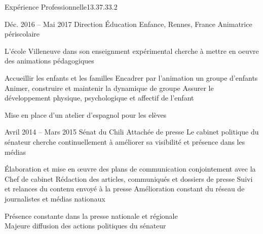 \documentclass[30pt, french]{tccv}
\begin{document}
\begin{upshape}
\begin{flat_frame}{Expérience Professionnelle}{13.3}{7.3}{3.2}{}
\begin{eventlist}
\setlength{\parskip}{0pt}
\item{Déc. 2016 -- Mai 2017 }     
  {Direction Éducation Enfance, Rennes, France}     
  {Animatrice périscolaire}
  \fontsize{9pt}{1em}\color{text}\bodyfontlight\upshape\selectfont

 L'école Villeneuve dans son enseignment expérimental cherche à mettre en oeuvre des animations pédagogiques   \\
  
\setlength{\parskip}{-10pt}
\begin{itemize}
      \setlength\itemsep{-3pt} 
      \cvitem[\checkmark] Accueillir les enfants et les familles
      \cvitem[\checkmark] Encadrer par l’animation un groupe d’enfants
      \cvitem[\checkmark] Animer, construire et maintenir la dynamique de groupe
      \cvitem[\checkmark] Assurer le développement physique, psychologique et affectif de l’enfant
\end{itemize}        

 Mise en place d'un atelier d'espagnol pour les elèves \\
\mission{}



\setlength{\parskip}{0pt}
\item{\color{text} Avril 2014 -- Mars 2015}
     {Sénat du Chili}
     {Attachée de presse}
     \fontsize{9pt}{1em}\color{text}\bodyfontlight\upshape\selectfont
%
 Le cabinet politique du sénateur  cherche continuellement à améliorer sa visibilité et présence dans les médias \\ 

    \setlength{\parskip}{-10pt}
    \begin{itemize}
      \setlength\itemsep{-3pt} 
      \cvitem[\checkmark] Élaboration et mise en œuvre des plans de communication conjointement avec la Chef de cabinet
      \cvitem[\checkmark] Rédaction des articles, communiqués et dossiers de presse
      \cvitem[\checkmark] Suivi et relances du contenu envoyé à la presse
      \cvitem[\checkmark] Amélioration constant du réseau de journalistes et médias nationaux
      
      
      
      
    \end{itemize}     
 Présence constante dans la presse nationale et régionale  \\
\mission{}            Majeure diffusion des actions politiques du sénateur
    

\end{eventlist}
\end{flat_frame}
\end{upshape}
\end{document}
